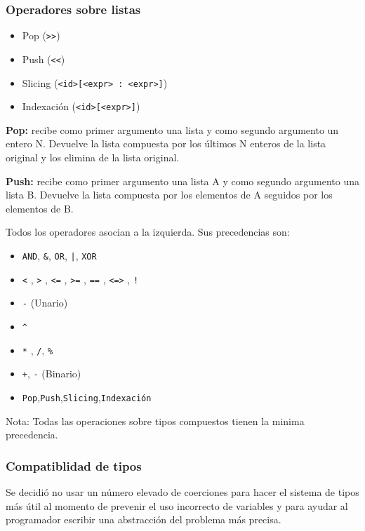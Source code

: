 \documentclass[12pt, spanish]{report}
\begin{document}
\subsubsection{Operadores sobre listas}
\begin{itemize}
\item Pop          (\texttt{\textgreater \textgreater})
\item Push         (\texttt{\textless \textless})
\item Slicing      (\texttt{<id>[<expr> : <expr>]})
\item Indexaci\'on (\texttt{<id>[<expr>]})
\end{itemize}

\textbf{Pop:} recibe como primer argumento una lista y como segundo
argumento un entero N. Devuelve la lista compuesta por los \'ultimos N
enteros de la lista original y los elimina de la lista original.

\textbf{Push:} recibe como primer argumento una lista A y como segundo
argumento una lista B. Devuelve la lista compuesta por los elementos de
A seguidos por los elementos de B.

Todos los operadores asocian a la izquierda. Sus precedencias son:
\begin{itemize}
\item \texttt{AND}, \texttt{\&}, \texttt{OR}, \texttt{|}, \texttt{XOR}
\item \texttt{<} , \texttt{>} , \texttt{<=} , \texttt{>=} , \texttt{==} , \texttt{<=>} , \texttt{!}
\item \texttt{-} (Unario)
\item \texttt{\^}
\item \texttt{*} ,  \texttt{/}, \texttt{\%}
\item \texttt{+}, \texttt{-} (Binario)
\item \texttt{Pop},\texttt{Push},\texttt{Slicing},\texttt{Indexaci\'on} 
\end{itemize}
Nota: Todas las operaciones sobre tipos compuestos tienen la minima precedencia.


\subsubsection{Compatiblidad de tipos}
\label{subsec:comp-tipos}
Se decidi\'o no usar un n\'umero elevado de coerciones para hacer el
sistema de tipos m\'as \'util al momento de prevenir el uso incorrecto
de variables y para ayudar al programador escribir una abstracci\'on del
problema m\'as precisa.\\
\end{document}
